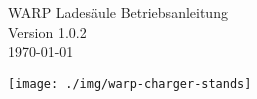 \documentclass[a4paper,10pt]{article}
\title{}
\author{}
\begin{document}
\pagestyle{empty}
\begin{titlepage}
	\vspace*{-3.08cm}
	\colorbox{boxgray}{}
	\vfill
	\begin{center}
		\Huge
		WARP Ladesäule Betriebsanleitung\\\vspace{1cm}
		\large
		Version 1.0.2\\\vspace{0.25cm}
		\today
	\end{center}
	\vfill
	\begin{center}
		\texttt{[image: ./img/warp-charger-stands]}
	\end{center}
\end{titlepage}
\newpage
\null
\newpage
\pagestyle{fancy}
\end{document}
